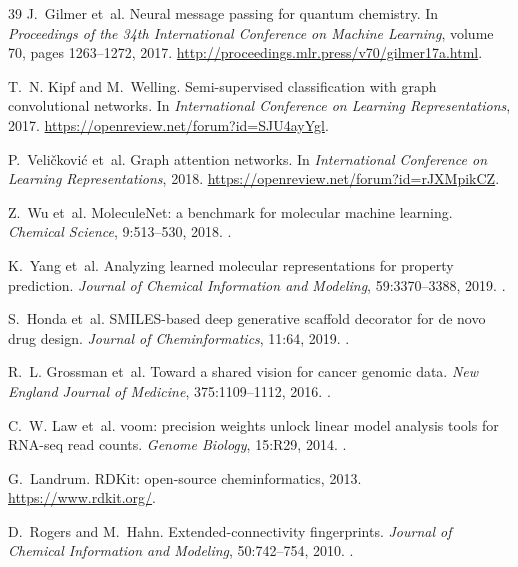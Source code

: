 \begin{thebibliography}{39}
J.~Gilmer et~al.
\newblock Neural message passing for quantum chemistry.
\newblock In \emph{Proceedings of the 34th International Conference on Machine Learning}, volume 70, pages 1263--1272, 2017.
\newblock \url{http://proceedings.mlr.press/v70/gilmer17a.html}.

T.~N. Kipf and M.~Welling.
\newblock Semi-supervised classification with graph convolutional networks.
\newblock In \emph{International Conference on Learning Representations}, 2017.
\newblock \url{https://openreview.net/forum?id=SJU4ayYgl}.

P.~Veli{\v{c}}kovi{\'c} et~al.
\newblock Graph attention networks.
\newblock In \emph{International Conference on Learning Representations}, 2018.
\newblock \url{https://openreview.net/forum?id=rJXMpikCZ}.

Z.~Wu et~al.
\newblock MoleculeNet: a benchmark for molecular machine learning.
\newblock \emph{Chemical Science}, 9:513--530, 2018.
\newblock {}.

K.~Yang et~al.
\newblock Analyzing learned molecular representations for property prediction.
\newblock \emph{Journal of Chemical Information and Modeling}, 59:3370--3388, 2019.
\newblock {}.

S.~Honda et~al.
\newblock SMILES-based deep generative scaffold decorator for de novo drug design.
\newblock \emph{Journal of Cheminformatics}, 11:64, 2019.
\newblock {}.

R.~L. Grossman et~al.
\newblock Toward a shared vision for cancer genomic data.
\newblock \emph{New England Journal of Medicine}, 375:1109--1112, 2016.
\newblock {}.

C.~W. Law et~al.
\newblock voom: precision weights unlock linear model analysis tools for RNA-seq read counts.
\newblock \emph{Genome Biology}, 15:R29, 2014.
\newblock {}.

G.~Landrum.
\newblock RDKit: open-source cheminformatics, 2013.
\newblock \url{https://www.rdkit.org/}.

D.~Rogers and M.~Hahn.
\newblock Extended-connectivity fingerprints.
\newblock \emph{Journal of Chemical Information and Modeling}, 50:742--754, 2010.
\newblock {}.


\end{thebibliography}
